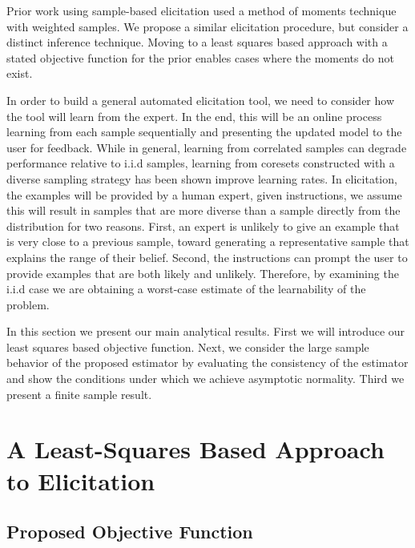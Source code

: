 Prior work using sample-based elicitation used a method of moments technique with weighted samples. 
We propose a similar elicitation procedure, but consider a distinct inference technique. 
Moving to a least squares based approach with a stated objective function for the prior enables cases where the moments do not exist. 

In order to build a general automated elicitation tool, we need to consider how the tool will learn from the expert. 
In the end, this will be an online process learning from each sample sequentially and presenting the updated model to the user for feedback. 
While in general, learning from correlated samples can degrade performance relative to i.i.d samples, learning from coresets constructed with a diverse sampling strategy has been shown improve learning rates. 
In elicitation, the examples will be provided by a human expert, given instructions, we assume this will result in samples that are more diverse than a sample directly from the distribution for two reasons. 
First, an expert is unlikely to give an example that is very close to a previous sample, toward generating a representative sample that explains the range of their belief. 
Second, the instructions can prompt the user to provide examples that are both likely and unlikely. 
Therefore, by examining the i.i.d case we are obtaining a worst-case estimate of the learnability of the problem. 


In this section we present our main analytical results. 
First we will introduce our least squares based objective function. 
Next, we consider the large sample behavior of the proposed estimator 
by evaluating the consistency of the estimator and show the conditions under which we achieve asymptotic normality. 
Third we present a finite sample result. 

\section*{A Least-Squares Based Approach to Elicitation}

\subsection*{Proposed Objective Function}

